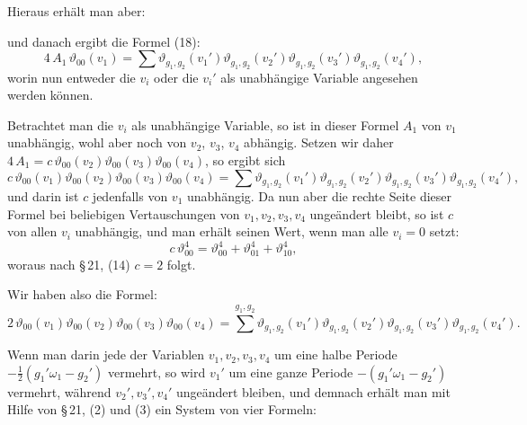 
Hieraus erhält man aber:


und danach ergibt die Formel (18):
\[
4\,A_1\,\vartheta_{00}(v_1) = \sum \vartheta_{g_1,g_2}(v_1')\vartheta_{g_1,g_2}(v_2')\vartheta_{g_1,g_2}(v_3')\vartheta_{g_1,g_2}(v_4'),
\]
worin nun entweder die $v_i$ oder die $v_i'$ als unabhängige Variable angesehen werden können.

Betrachtet man die $v_i$ als unabhängige Variable, so ist in dieser Formel $A_1$ von $v_1$ unabhängig, wohl aber noch von $v_2$, $v_3$, $v_4$ abhängig. Setzen wir daher $4\,A_1 = c\,\vartheta_{00}(v_2)\vartheta_{00}(v_3)\vartheta_{00}(v_4)$, so ergibt sich
\[
c\,\vartheta_{00}(v_1)\vartheta_{00}(v_2)\vartheta_{00}(v_3)\vartheta_{00}(v_4)
= \sum \vartheta_{g_1,g_2}(v_1')\vartheta_{g_1,g_2}(v_2')\vartheta_{g_1,g_2}(v_3')\vartheta_{g_1,g_2}(v_4'),
\]
und darin ist $c$ jedenfalls von $v_1$ unabhängig. Da nun aber die rechte Seite dieser Formel bei beliebigen Vertauschungen von $v_1, v_2, v_3, v_4$ ungeändert bleibt, so ist $c$ von allen $v_i$ unabhängig, und man erhält seinen Wert, wenn man alle $v_i = 0$ setzt:
\[
c\,\vartheta_{00}^4 = \vartheta_{00}^4 + \vartheta_{01}^4 + \vartheta_{10}^4,
\]
woraus nach \S\,21, (14) $c=2$ folgt.

Wir haben also die Formel:
\[
2\,\vartheta_{00}(v_1)\vartheta_{00}(v_2)\vartheta_{00}(v_3)\vartheta_{00}(v_4)
= \sum\limits^{g_1,g_2} \vartheta_{g_1,g_2}(v_1')\vartheta_{g_1,g_2}(v_2')\vartheta_{g_1,g_2}(v_3')\vartheta_{g_1,g_2}(v_4').
\]

Wenn man darin jede der Variablen $v_1, v_2, v_3, v_4$ um eine halbe Periode $-\tfrac{1}{2}(g_1'\omega_1 - g_2')$ vermehrt, so wird $v_1'$ um eine ganze Periode $-(g_1'\omega_1 - g_2')$ vermehrt, während $v_2', v_3', v_4'$ ungeändert bleiben, und demnach erhält man mit Hilfe von \S\,21, (2) und (3) ein System von vier Formeln:

